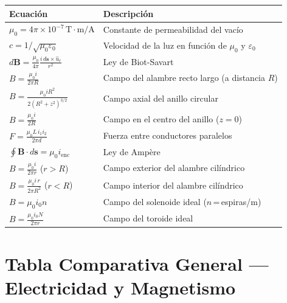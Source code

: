 \documentclass[12pt, letterpaper]{report}
\numberwithin{equation}{section}
\newcommand{\vB}[1]{\boldsymbol{#1}}          %
\newcommand{\un}[1]{\,\mathrm{#1}}            %
\begin{document}
\begin{center}
\renewcommand{\arraystretch}{1.7}
\begin{longtable}{p{}p{}}
  \toprule
  \textbf{Ecuación} & \textbf{Descripción} \\
  \midrule
  $\displaystyle\mu_0=4\pi\times10^{-7}\un{T\cdot m/A}$ &
        Constante de permeabilidad del vacío \\
  $\displaystyle c=1/\!\sqrt{\mu_0\varepsilon_0}$ &
        Velocidad de la luz en función de $\mu_0$ y $\varepsilon_0$ \\
  $\displaystyle d\vB{B}=\frac{\mu_0}{4\pi}
        \frac{i\,d\vB{s}\times\hat{u}_r}{r^2}$ &
        Ley de Biot-Savart \\
  $\displaystyle B=\frac{\mu_0 i}{2\pi R}$ &
        Campo del alambre recto largo (a distancia $R$) \\
  $\displaystyle B=\frac{\mu_0 iR^2}{2(R^2+z^2)^{3/2}}$ &
        Campo axial del anillo circular \\
  $\displaystyle B=\frac{\mu_0 i}{2R}$ &
        Campo en el centro del anillo ($z=0$) \\
  $\displaystyle F=\frac{\mu_0 L\,i_1i_2}{2\pi d}$ &
        Fuerza entre conductores paralelos \\
  $\displaystyle\oint\vB{B}\cdot d\vB{s}=\mu_0 i_\text{enc}$ &
        Ley de Ampère \\
  $\displaystyle B=\frac{\mu_0 i}{2\pi r}$ ($r>R$) &
        Campo exterior del alambre cilíndrico \\
  $\displaystyle B=\frac{\mu_0 i\,r}{2\pi R^2}$ ($r<R$) &
        Campo interior del alambre cilíndrico \\
  $\displaystyle B=\mu_0 i_0 n$ &
        Campo del solenoide ideal ($n$\,=\,espiras/m) \\
  $\displaystyle B=\frac{\mu_0 i_0 N}{2\pi r}$ &
        Campo del toroide ideal \\
  \bottomrule
\end{longtable}
\end{center}

\section*{Tabla Comparativa General — Electricidad y Magnetismo}
\end{document}
